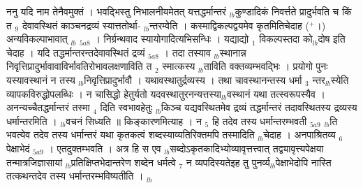 \documentclass[article,12pt,a4paper]{memoir}%
\newcommand{\add}[1]{($^{+}$#1)}
\newcounter{parCount}
\begin{document}
	  
	  \pstart \leavevmode%
	\hphantom{.}{\color{DodgerBlue3}ननु यदि नाम तेनैवमुक्तं} । भवद्भिस्तु निभालनीयमेतत् यत्तद्धर्मान्तरं {\tiny $_{lb}$}कुण्डादिकं निवर्त्तते प्रादुर्भवति च किं त {\tiny $_{9}$} \leavevmode{} देवावस्थितं काञ्चनद्रव्यं स्यात्ततोर्था- {\tiny $_{lb}$}न्तरम्वेति । कस्माद्विकल्पद्वयमेव कृतमितिचेदाह \add{।} {\color{DodgerBlue3}अन्यविकल्पाभावात्} {\tiny $_{lb}$} {\tiny $_{5a8}$} । {\color{DodgerBlue3}निर्ग्रन्थवाद} स्यायोगादित्यभिसन्धिः । यद्याद्यो {\tiny $_{1}$} विकल्पस्तदा को{\tiny $_{lb}$}दोष इति चेदाह । यदि तद्धर्मान्तरन्तदेवावस्थितं द्रव्यं {\tiny $_{5a8}$} । तदा तस्याव {\tiny $_{lb}$}स्थानान्न निवृत्तिप्रादुर्भावावाविर्भावतिरोभावलक्षणाविति त {\tiny $_{2}$} स्मात्कस्य {\tiny $_{lb}$}ताविति वक्तव्यम्भवद्भिः । {\color{DodgerBlue3}प्रयोगो} पुनः यस्यावस्थानं न तस्य {\tiny $_{lb}$}निवृत्तिप्रादुर्भावौ । यथावस्थातुर्द्रव्यस्य । तथा चावस्थानन्तस्य धर्मा {\tiny $_{3}$} न्तर{\tiny $_{lb}$}स्येति व्यापकविरुद्धोपलब्धिः । न चासिद्धो हेतुर्यतो यदवस्थातुरनन्यत्तस्या{\tiny $_{lb}$}वस्थानं यथा तत्स्वरूपस्यैव । अनन्यच्चैतद्धर्मान्तरं तस्मा {\tiny $_{4}$} दिति स्वभावहेतुः {\tiny $_{lb}$}किञ्च यद्यवस्थितमेव द्रव्यं तद्धर्मान्तरं तदावस्थितस्य द्रव्यस्य धर्मान्तरमिति । {\tiny $_{lb}$}वचनं सिध्यति ॥ किङ्कारणमित्याह । {\color{DodgerBlue3}न {\tiny $_{5}$} हि तदेव तस्य धर्मान्तरम्भवती} {\tiny $_{5a9}$} {\tiny $_{lb}$}ति भवत्येव तदेव तस्य धर्मान्तरं यथा कृतकत्वं शब्दस्याव्यतिरिक्तमपि तस्मादिति {\tiny $_{lb}$}चेदाह । {\color{DodgerBlue3}अनपाश्रितव्य {\tiny $_{6}$} पेक्षाभेदं} {\tiny $_{5a9}$} । एतदुक्तम्भवति । अत्र हि स एव {\tiny $_{lb}$}सब्दोऽकृतकादिभ्योव्यावृत्तत्त्वात् तद्व्यावृत्त्यपेक्षया तन्मात्रजिज्ञासायां {\tiny $_{lb}$}प्रतिक्षिप्तभेदान्तरेण शब्देन धर्मत्वे {\tiny $_{7}$} न व्यपदिस्यतेइह तु पुनर्व्य{\tiny $_{lb}$}पेक्षाभेदोपि नास्ति तत्कथन्तदेव तस्य धर्मान्तरम्भविष्यतीति ।
	{}
	\pend%
      {\tiny $_{lb}$}
\end{document}

